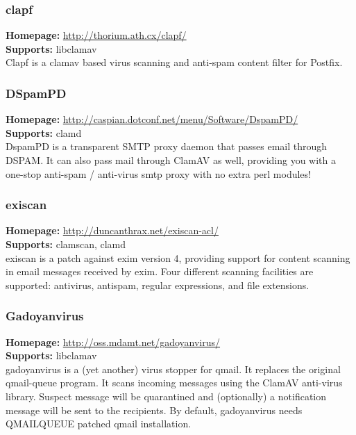 \documentclass[a4paper,titlepage,12pt]{article}
\begin{document}
    \subsubsection{clapf}
    \textbf{Homepage:} \url{http://thorium.ath.cx/clapf/}\\
    \textbf{Supports:} libclamav\\[4pt]
    Clapf is a clamav based virus scanning and anti-spam content filter for
    Postfix.

    \subsubsection{DSpamPD}
    \textbf{Homepage:} \url{http://caspian.dotconf.net/menu/Software/DspamPD/}\\
    \textbf{Supports:} clamd\\[4pt]
    DspamPD is a transparent SMTP proxy daemon that passes email through DSPAM.
    It can also pass mail through ClamAV as well, providing you with a one-stop
    anti-spam / anti-virus smtp proxy with no extra perl modules!

    \subsubsection{exiscan}
    \textbf{Homepage:} \url{http://duncanthrax.net/exiscan-acl/}\\
    \textbf{Supports:} clamscan, clamd\\[4pt]
    exiscan is a patch against exim version 4, providing support for content
    scanning in email messages received by exim. Four different scanning
    facilities are supported: antivirus, antispam, regular expressions, and
    file extensions.

    \subsubsection{Gadoyanvirus}
    \textbf{Homepage:} \url{http://oss.mdamt.net/gadoyanvirus/}\\
    \textbf{Supports:} libclamav\\[4pt]
    gadoyanvirus is a (yet another) virus stopper for qmail. It replaces the
    original qmail-queue program. It scans incoming messages using the ClamAV
    anti-virus library. Suspect message will be quarantined and (optionally)
    a notification message will be sent to the recipients. By default,
    gadoyanvirus needs QMAILQUEUE patched qmail installation. 
\end{document}
